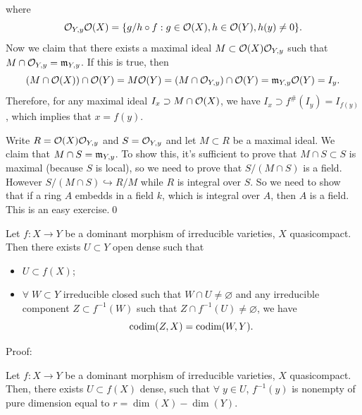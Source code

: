 where 
\begin{equation}
    \mathcal{O}_{Y,y}\mathcal{O}(X)=\{g/h\circ f:g\in\mathcal{O}(X), h\in\mathcal{O}(Y),h(y)\neq0\}.
\end{equation}
Now we claim that there exists a maximal ideal $M\subset \mathcal{O}(X)\mathcal{O}_{Y,y}$ such that 
$M\cap\mathcal{O}_{Y,y}=\mathfrak{m}_{Y,y}$. If this is true, then 
\begin{equation}
    (M\cap \mathcal{O}(X))\cap\mathcal{O}(Y)=M\mathcal{O}(Y)=(M\cap\mathcal{O}_{Y,y})\cap\mathcal{O}(Y)=\mathfrak{m}_{Y,y}\mathcal{O}(Y)=I_y.
\end{equation}
Therefore, for any maximal ideal $I_x\supset M\cap\mathcal{O}(X)$, we have $I_x\supset f^\#(I_y)=I_{f(y)}$, which implies that 
$x=f(y)$.\par 
Write $R= \mathcal{O}(X)\mathcal{O}_{Y,y}$ and $S =\mathcal{O}_{Y,y}$ and let $M\subset R$ be a maximal ideal. We claim that 
$M\cap S=\mathfrak{m}_{Y,y}$. To show this, it's sufficient to prove that $M\cap S\subset S$ is maximal (because $S$ is local), 
so we need to prove that $S/(M\cap S)$ is a field. However $S/(M\cap S)\hookrightarrow R/M$ 
while $R$ is integral over $S$. So we need to show that if a ring $A$ embedds in a field $k$, which is integral over 
$A$, then $A$ is a field. This is an easy exercise.\qed

\begin{dang}
\begin{theorem}
    Let $f:X\to Y$ be a dominant morphism of irreducible varieties, $X$ quasicompact. Then there exists 
    $U\subset Y$ open dense such that 
    \begin{itemize}
        \item[(1)] $U\subset f(X)$;
        \item[(2)] $\forall\; W\subset Y$ irreducible closed such that $W\cap U\neq\varnothing$ and 
        any irreducible component $Z\subset f^{-1}(W)$ such that $Z\cap f^{-1}(U)\neq\varnothing$, we have 
        \begin{equation}
            \text{codim}(Z,X)=\text{codim}(W,Y).
        \end{equation} 
    \end{itemize}
\end{theorem}
\end{dang}
Proof:\TODO

\begin{dang}
\begin{corollary}
    Let $f:X\to Y$ be a dominant morphism of irreducible varieties, $X$ quasicompact. Then, there exists $U\subset f(X)$
    dense, such that $\forall\;y\in U$, $f^{-1}(y)$ is nonempty of pure dimension equal to $r=\dim(X)-\dim(Y)$. 
\end{corollary}
\end{dang}
